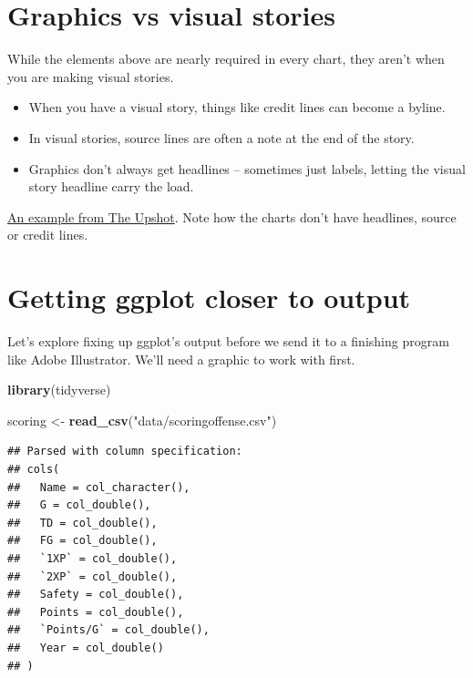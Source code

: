 \documentclass[]{book}
\newenvironment{Shaded}{\begin{snugshade}}{\end{snugshade}}
\newcommand{\KeywordTok}[1]{\textcolor[rgb]{0.13,0.29,0.53}{\textbf{#1}}}
\newcommand{\StringTok}[1]{\textcolor[rgb]{0.31,0.60,0.02}{#1}}
\newcommand{\NormalTok}[1]{#1}
\providecommand{\tightlist}{%
  \setlength{\itemsep}{0pt}\setlength{\parskip}{0pt}}
\begin{document}
\section{Graphics vs visual stories}\label{graphics-vs-visual-stories}

While the elements above are nearly required in every chart, they aren't
when you are making visual stories.

\begin{itemize}
\tightlist
\item
  When you have a visual story, things like credit lines can become a
  byline.
\item
  In visual stories, source lines are often a note at the end of the
  story.
\item
  Graphics don't always get headlines -- sometimes just labels, letting
  the visual story headline carry the load.
\end{itemize}

\href{https://www.nytimes.com/interactive/2018/02/14/business/economy/inflation-prices.html}{An
example from The Upshot}. Note how the charts don't have headlines,
source or credit lines.

\section{Getting ggplot closer to
output}\label{getting-ggplot-closer-to-output}

Let's explore fixing up ggplot's output before we send it to a finishing
program like Adobe Illustrator. We'll need a graphic to work with first.

\begin{Shaded}
\begin{Highlighting}[]
\KeywordTok{library}\NormalTok{(tidyverse)}
\end{Highlighting}
\end{Shaded}

\begin{Shaded}
\begin{Highlighting}[]
\NormalTok{scoring <-}\StringTok{ }\KeywordTok{read_csv}\NormalTok{(}\StringTok{"data/scoringoffense.csv"}\NormalTok{)}
\end{Highlighting}
\end{Shaded}

\begin{verbatim}
## Parsed with column specification:
## cols(
##   Name = col_character(),
##   G = col_double(),
##   TD = col_double(),
##   FG = col_double(),
##   `1XP` = col_double(),
##   `2XP` = col_double(),
##   Safety = col_double(),
##   Points = col_double(),
##   `Points/G` = col_double(),
##   Year = col_double()
## )
\end{verbatim}
\end{document}
